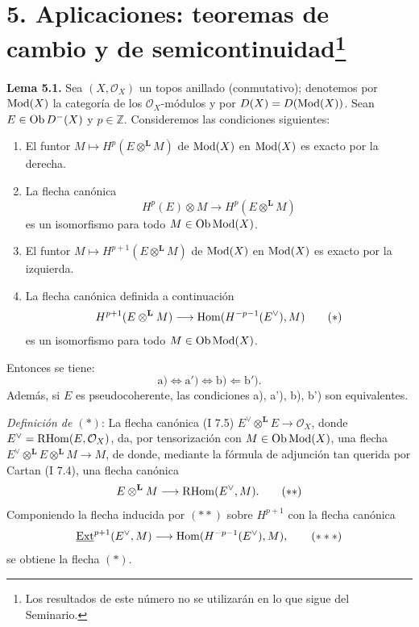 \providecommand{\sisi}[2]{#2}

\section*{5. Aplicaciones: teoremas de cambio y de semicontinuidad\footnote{Los resultados de este número no se utilizarán en lo que sigue del Seminario.}}

\textbf{Lema 5.1.} Sea \((X,\mathcal O_X)\) un topos anillado (conmutativo); denotemos por \(\operatorname{Mod}(X)\) la categoría de los \(\mathcal O_X\)-módulos y por \(D(X)=D(\operatorname{Mod}(X))\). Sean \(E\in\operatorname{Ob} D^-(X)\) y \(p\in\mathbb Z\). Consideremos las condiciones siguientes:
\begin{enumerate}[label=\alph*)]
\item El funtor \(M\mapsto H^p(E\otimes^{\mathbf L}M)\) de \(\operatorname{Mod}(X)\) en \(\operatorname{Mod}(X)\) es exacto por la derecha.
\item[a')] La flecha canónica
\[
 H^p(E)\otimes M\longrightarrow H^p(E\otimes^{\mathbf L}M)
\]
es un isomorfismo para todo \(M\in\operatorname{Ob}\operatorname{Mod}(X)\).
\item[b)] El funtor \(M\mapsto H^{p+1}(E\otimes^{\mathbf L}M)\) de \(\operatorname{Mod}(X)\) en \(\operatorname{Mod}(X)\) es exacto por la izquierda.
\item[b')] La flecha canónica definida a continuación
\begin{equation}
 H^{p+1}(E\otimes^{\mathbf L}M)\longrightarrow\operatorname{Hom}(H^{-p-1}(E^{\vee}),M)\tag{$*$}
\end{equation}
es un isomorfismo para todo \(M\in\operatorname{Ob}\operatorname{Mod}(X)\).
\end{enumerate}
Entonces se tiene:
\[
 \mathrm a)\Longleftrightarrow\mathrm a')\Longleftrightarrow\mathrm b)\Longleftarrow\mathrm b').
\]
Además, si \(E\) es pseudocoherente, las condiciones a), a'), b), b') son equivalentes.

\emph{Definición de \((*)\)}: La flecha canónica (I 7.5) \(E^{\vee}\otimes^{\mathbf L}E\longrightarrow\mathcal O_X\), donde \(E^{\vee}=\mathrm R\!\operatorname{Hom}(E,\mathcal O_X)\), da, por tensorización con \(M\in\operatorname{Ob}\operatorname{Mod}(X)\), una flecha \(E^{\vee}\otimes^{\mathbf L}E\otimes^{\mathbf L}M\longrightarrow M\), de donde, mediante la fórmula de adjunción tan querida por Cartan (I 7.4), una flecha canónica
\begin{equation}
 E\otimes^{\mathbf L}M\longrightarrow\mathrm R\!\operatorname{Hom}(E^{\vee},M).\tag{$**$}
\end{equation}
Componiendo la flecha inducida por \((**)\) sobre \(H^{p+1}\) con la flecha canónica
\begin{equation}
 \underline{\operatorname{Ext}}^{p+1}(E^{\vee},M)\longrightarrow\operatorname{Hom}(H^{-p-1}(E^{\vee}),M),\tag{$***$}
\end{equation}
se obtiene la flecha \((*)\).


